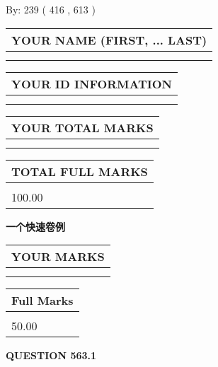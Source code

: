 \documentclass{ctexart}
\begin{document}
   
\hspace{1.0in} By: 
 239 ( 416 ,  613 )
   
   
   
   
\newpage 
\setcounter{page}{ 
   563001 } 
   
   
   
   
\noindent\begin{tabular}{|l|}
\hline
YOUR NAME (FIRST, ... LAST)  \\
\hline
 \\ 
 \\ 
\hline
\end{tabular}
\hspace{0.05in} \begin{tabular}{|l|}
\hline
 YOUR   ID   INFORMATION  \\
\hline
 \\ 
 \\ 
\hline
\end{tabular}
   
   
\vspace{0.2in}\noindent\begin{tabular}{|l|}
\hline
YOUR TOTAL MARKS  \\
\hline
 \\ 
 \\ 
\hline
\end{tabular}
\hspace{0.05in} \begin{tabular}{|l|}
\hline
TOTAL FULL MARKS  \\
\hline
 \\ 
100.00 \\
\hline
\end{tabular}
   
   
 \vspace{0.2in}
{\LARGE {\textbf{ 一个快速卷例}}}
   
   
  
\vspace{0.2in}
  
\noindent\begin{tabular}{|l|}
\hline
 YOUR MARKS  \\
\hline
 \\ 
 \\ 
\hline
\end{tabular}
\hspace{0.05in} \begin{tabular}{|l|}
\hline
 Full Marks  \\
\hline
 \\ 
50.00 \\
\hline
\end{tabular}
{\textbf{\Large{QUESTION
563.1 
}}}
  
\end{document}

